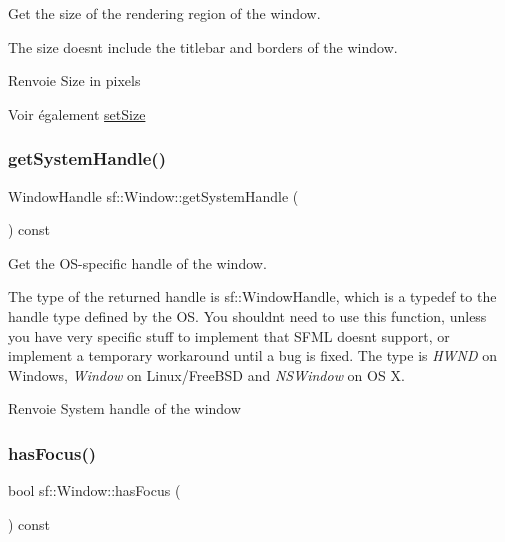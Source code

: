 Get the size of the rendering region of the window. 

The size doesn\textquotesingle{}t include the titlebar and borders of the window.

\begin{DoxyReturn}{Renvoie}
Size in pixels
\end{DoxyReturn}
\begin{DoxySeeAlso}{Voir également}
\hyperlink{classsf_1_1Window_ab94ea32f22d15c0df11588e319de2546}{set\+Size} 
\end{DoxySeeAlso}
\mbox{\label{classsf_1_1Window_ad2fa6be5104ec0bfe79af7a5f524ea90}} 
\subsubsection{\texorpdfstring{get\+System\+Handle()}{getSystemHandle()}}
{\footnotesize\ttfamily Window\+Handle sf\+::\+Window\+::get\+System\+Handle (\begin{DoxyParamCaption}{ }\end{DoxyParamCaption}) const}



Get the O\+S-\/specific handle of the window. 

The type of the returned handle is sf\+::\+Window\+Handle, which is a typedef to the handle type defined by the OS. You shouldn\textquotesingle{}t need to use this function, unless you have very specific stuff to implement that S\+F\+ML doesn\textquotesingle{}t support, or implement a temporary workaround until a bug is fixed. The type is {\itshape H\+W\+ND} on Windows, {\itshape Window} on Linux/\+Free\+B\+SD and {\itshape N\+S\+Window} on OS X.

\begin{DoxyReturn}{Renvoie}
System handle of the window 
\end{DoxyReturn}
\mbox{\label{classsf_1_1Window_ad8db2e6500d13ca9396281296404ba31}} 
\subsubsection{\texorpdfstring{has\+Focus()}{hasFocus()}}
{\footnotesize\ttfamily bool sf\+::\+Window\+::has\+Focus (\begin{DoxyParamCaption}{ }\end{DoxyParamCaption}) const}



